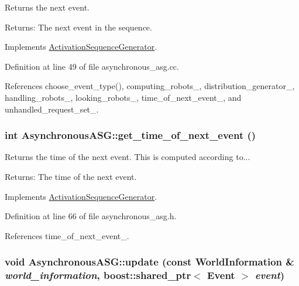 Returns the next event. \begin{Desc}
\item[Returns:]The next event in the sequence. \end{Desc}


Implements \hyperlink{class_activation_sequence_generator_cf20a8caaee580655c57b8843d82d5f5}{ActivationSequenceGenerator}.

Definition at line 49 of file asynchronous\_\-asg.cc.

References choose\_\-event\_\-type(), computing\_\-robots\_\-, distribution\_\-generator\_\-, handling\_\-robots\_\-, looking\_\-robots\_\-, time\_\-of\_\-next\_\-event\_\-, and unhandled\_\-request\_\-set\_\-.\hypertarget{class_asynchronous_a_s_g_163256359314a7c69e5cfb684f311201}{
\subsubsection[get\_\-time\_\-of\_\-next\_\-event]{\setlength{\rightskip}{0pt plus 5cm}int AsynchronousASG::get\_\-time\_\-of\_\-next\_\-event ()}}
\label{class_asynchronous_a_s_g_163256359314a7c69e5cfb684f311201}


Returns the time of the next event. This is computed according to... \begin{Desc}
\item[Returns:]The time of the next event. \end{Desc}


Implements \hyperlink{class_activation_sequence_generator_724cfa2e135813db7becb90af1783050}{ActivationSequenceGenerator}.

Definition at line 66 of file asynchronous\_\-asg.h.

References time\_\-of\_\-next\_\-event\_\-.\hypertarget{class_asynchronous_a_s_g_159110685ece0b48788dcf9d2c085010}{
\subsubsection[update]{\setlength{\rightskip}{0pt plus 5cm}void AsynchronousASG::update (const {\bf WorldInformation} \& {\em world\_\-information}, \/  boost::shared\_\-ptr$<$ Event $>$ {\em event})}}
\label{class_asynchronous_a_s_g_159110685ece0b48788dcf9d2c085010}


